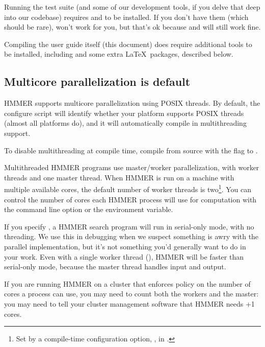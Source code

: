 Running the test suite (and some of our development tools, if you
delve that deep into our codebase) requires  and
to be installed.  If you don't have them (which should be rare),
 won't work for you, but that's ok because
 and  will still work fine.

Compiling the user guide itself (this document) does require
additional tools to be installed, including  and some extra
\LaTeX\ packages, described below.


\subsection{Multicore parallelization is default}

HMMER supports multicore parallelization using POSIX threads. By
default, the configure script will identify whether your platform
supports POSIX threads (almost all platforms do), and it will
automatically compile in multithreading support.

To disable multithreading at compile time, compile from source with
the  flag to .

Multithreaded HMMER programs use master/worker parallelization, with
 worker threads and one master thread. When HMMER is run on
a machine with multiple available cores, the default number of worker
threads is two\footnote{Set by a compile-time configuration option,
  , in .}. You can control the
number of cores each HMMER process will use for computation with the
 command line option or the 
environment variable.

If you specify , a HMMER search program will run in
serial-only mode, with no threading. We use this in debugging when we
suspect something is awry with the parallel implementation, but it's
not something you'd generally want to do in your work.  Even with a
single worker thread (), HMMER will be faster than
serial-only mode, because the master thread handles input and output.

If you are running HMMER on a cluster that enforces policy on the
number of cores a process can use, you may need to count both the
workers and the master: you may need to tell your cluster management
software that HMMER needs +1 cores.


